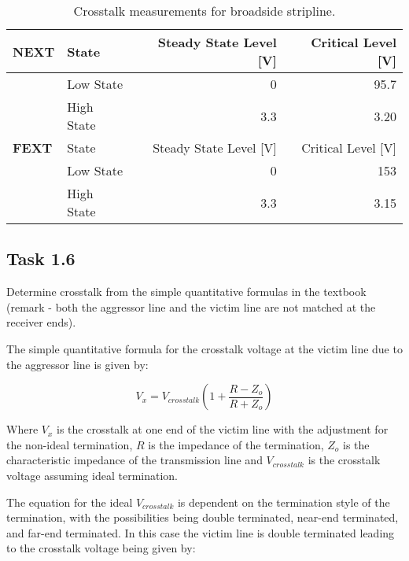 \documentclass[../main.tex]{subfiles}
\begin{document}
\begin{table}[h]
    \centering
    \begin{tabular}{l l|r r}
        \toprule[1pt]
        \textbf{NEXT} & State & Steady State Level [V] & Critical Level [V] \\
        \midrule
        & Low State & 0 & 95.7 \\
        & High State & 3.3 & 3.20 \\
        \midrule[1pt]
        \textbf{FEXT} & State & Steady State Level [V] & Critical Level [V] \\
        \midrule
        & Low State & 0 & 153 \\
        & High State & 3.3 & 3.15 \\
        \bottomrule[1pt]
    \end{tabular}
    \caption{Crosstalk measurements for broadside stripline.}
    \label{tab:sim-broadside-stripline}
\end{table}

\newpage

\subsection{Task 1.6}

Determine crosstalk from the simple quantitative formulas in the textbook (remark - both the aggressor line and the victim line are not matched at the receiver ends).

\solution

The simple quantitative formula for the crosstalk voltage at the victim line due to the aggressor line is given by:

\begin{equation*}
    V_x = V_{crosstalk} (1+ \frac{R-Z_o}{R+Z_o}) 
\end{equation*}

Where $V_x$ is the crosstalk at one end of the victim line with the adjustment for the non-ideal termination, $R$ is the impedance of the termination, $Z_o$ is the characteristic impedance of the transmission line and $V_{crosstalk}$ is the crosstalk voltage assuming ideal termination.

\vspace{10pt}

The equation for the ideal $V_{crosstalk}$ is dependent on the termination style of the termination, with the possibilities being double terminated, near-end terminated, and far-end terminated. In this case the victim line is double terminated leading to the crosstalk voltage being given by:
\end{document}
